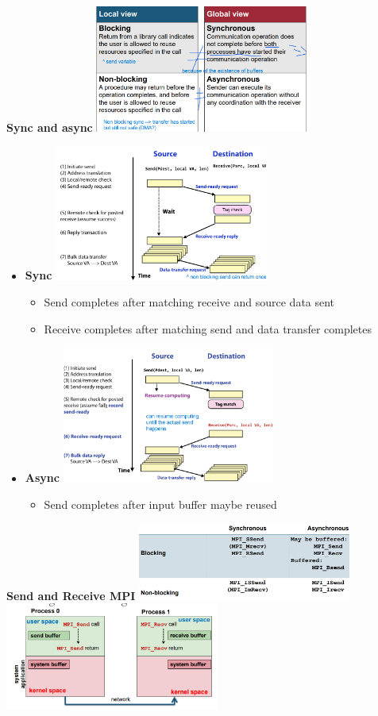 \documentclass[10pt, landscape]{article}
\begin{document}
\begin{multicols}{4}
\textbf{Sync and async}
\includegraphics*[width=7cm]{async_sync.png}
\begin{itemize}
    \item \textbf{Sync}
    \includegraphics*[width=7cm]{sync.png}
    \begin{itemize}
        \item Send completes after matching receive and source data sent 
        \item Receive completes after matching send and data transfer completes 
    \end{itemize}
    \item \textbf{Async}
    \includegraphics*[width=7cm]{async.png}
    \begin{itemize}
        \item Send completes after input buffer maybe reused
    \end{itemize}
\end{itemize}



\textbf{Send and Receive MPI}
\includegraphics*[width=7cm]{mpi_block_nonblock.png}
\includegraphics*[width=7cm]{mpi_buffer.png}


\end{multicols}
\end{document}
